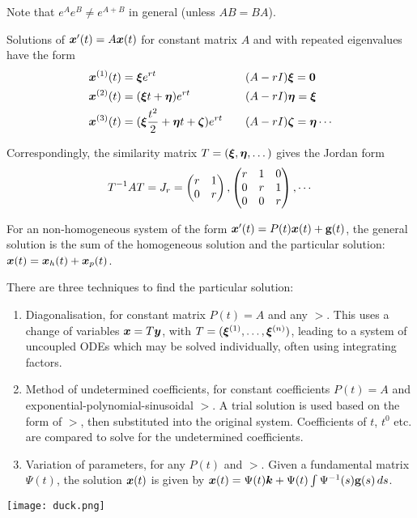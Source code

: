 \begin{remark}
	Note that $e^Ae^B \neq e^{A+B}$ in general (unless $AB = BA$).
\end{remark}

Solutions of $\bm{x}'(t) = A\bm{x}(t)$ for constant matrix $A$ and with repeated eigenvalues have the form
\begin{equation*}
	\begin{alignedat}{2}
		\bm{x}^{(1)}(t) &= \bm{\xi} e^{rt} \qquad &&(A-rI)\bm{\xi} = \bm{0} \\
		\bm{x}^{(2)}(t) &= (\bm{\xi} t + \bm{\eta})e^{rt} \qquad && (A-rI)\bm{\eta} = \bm{\xi} \\
		\bm{x}^{(3)}(t) &= (\bm{\xi} \frac{t^2}{2} + \bm{\eta} t + \bm{\zeta})e^{rt} \qquad &&(A-rI)\bm{\zeta} = \bm{\eta} \cdots
	\end{alignedat}
\end{equation*}

Correspondingly, the similarity matrix $T = (\bm{\xi}, \bm{\eta}, \dots)$ gives the Jordan form
\[
T^{-1}AT = J_r = \begin{pmatrix}r & 1 \\ 0 & r\end{pmatrix}, \begin{pmatrix}r & 1 & 0 \\ 0 & r & 1 \\ 0 & 0 & r\end{pmatrix}, \cdots
\]

For an non-homogeneous system of the form $\bm{x}'(t) = P(t)\bm{x}(t) + \textbf{g}(t)$, the general solution is the sum of the homogeneous solution and the particular solution: $\bm{x}(t) = \bm{x}_h(t) + \bm{x}_p(t)$.

There are three techniques to find the particular solution:
\begin{enumerate}
	\item Diagonalisation, for constant matrix $P(t)=A$ and any $\gt$. This uses a change of variables $\bm{x} = T\bm{y}$, with $T = (\bm{\xi} ^{(1)}, \ldots, \bm{\xi} ^{(n)})$, leading to a system of uncoupled ODEs which may be solved individually, often using integrating factors.
	\item Method of undetermined coefficients, for constant coefficients $P(t)=A$ and exponential-polynomial-sinusoidal $\gt$. A trial solution is used based on the form of $\gt$, then substituted into the original system. Coefficients of $t$, $t^0$ etc. are compared to solve for the undetermined coefficients.
	\item Variation of parameters, for any $P(t)$ and $\gt$. Given a fundamental matrix $\Psi(t)$, the solution $\bm{x}(t)$ is given by $\bm{x}(t) = \Psi(t)\bm{k} + \Psi(t) \int \Psi^{-1}(s) \textbf{g}(s)\,ds$.
\end{enumerate}

\vfill
\texttt{[image: duck.png]}
